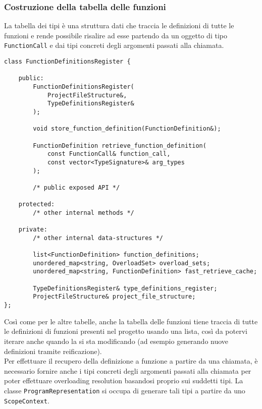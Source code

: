 \subsubsection{Costruzione della tabella delle funzioni}
La tabella dei tipi è una struttura dati che traccia le definizioni di tutte le funzioni
e rende possibile risalire ad esse partendo da un oggetto di tipo \texttt{FunctionCall} e dai 
tipi concreti degli argomenti passati alla chiamata. \\

\vspace{0.5cm}
\begin{lstlisting}[frame=single]
class FunctionDefinitionsRegister {

    public:
        FunctionDefinitionsRegister(
            ProjectFileStructure&,
            TypeDefinitionsRegister&
        );

        void store_function_definition(FunctionDefinition&);

        FunctionDefinition retrieve_function_definition(
            const FunctionCall& function_call, 
            const vector<TypeSignature>& arg_types
        );

        /* public exposed API */

    protected:
        /* other internal methods */

    private:
        /* other internal data-structures */

        list<FunctionDefinition> function_definitions;
        unordered_map<string, OverloadSet> overload_sets;
        unordered_map<string, FunctionDefinition> fast_retrieve_cache;
        
        TypeDefinitionsRegister& type_definitions_register;
        ProjectFileStructure& project_file_structure;
};
\end{lstlisting}
\vspace{0.5cm}

Così come per le altre tabelle, anche la tabella delle funzioni tiene traccia di tutte le definizioni
di funzioni presenti nel progetto usando una lista, così da potervi iterare anche quando la si sta modificando 
(ad esempio generando nuove definizioni tramite reificazione). \\

Per effettuare il recupero della definizione a funzione a partire da una chiamata, è necessario 
fornire anche i tipi concreti degli argomenti passati alla chiamata per poter effettuare overloading resolution 
basandosi proprio sui suddetti tipi. La classe \texttt{ProgramRepresentation} si occupa di generare tali tipi 
a partire da uno \texttt{ScopeContext}. \\

